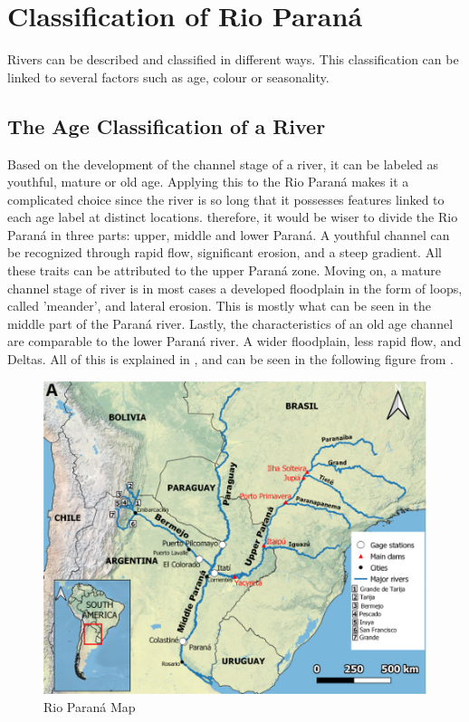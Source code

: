 \section{Classification of Rio Paraná}

Rivers can be described and classified in different ways. This classification can be linked to several factors such as age, colour or seasonality. 

\subsection{The Age Classification of a River}
Based on the development of the channel stage of a river, it can be labeled as youthful, mature or old age.  \autocite{davisGeographicalCycle1899}
Applying this to the Rio Paraná makes it a complicated choice since the river is so long that it possesses features linked to each age label at distinct locations. therefore, it would be wiser to divide the Rio Paraná in three parts: upper, middle and lower Paraná. A youthful channel can be recognized through rapid flow, significant erosion, and a steep gradient. All these traits can be attributed to the upper Paraná zone.
Moving on, a mature channel stage of river is in most cases a developed floodplain in the form of loops, called 'meander', and lateral erosion. This is mostly what can be seen in the middle part of the Paraná river.
Lastly, the characteristics of an old age channel are comparable to the lower Paraná river. A wider floodplain, less rapid flow, and Deltas. All of this is explained in \autocite{orfeoParanaRiverArgentine2023}, and can be seen in the following figure from \autocite{lopezweibelSourcesTemporalDynamics2022}.



\begin{figure}[H]
    \centering    \includegraphics[width=0.5\linewidth]{figures/ch2/map rio parana.png}
    \caption{Rio Paraná Map}
    \label{fig:rio parana map}
\end{figure}


